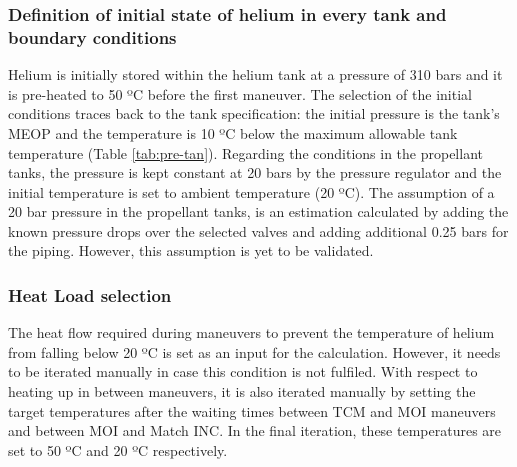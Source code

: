 \subsubsection{Definition of initial state of helium in every tank and boundary conditions}
Helium is initially stored within the helium tank at a pressure of 310 bars and it is pre-heated to 50 ºC before the first maneuver. The selection of the initial conditions traces back to the tank specification: the initial pressure is the tank's MEOP and the temperature is 10 ºC below the maximum allowable tank temperature (Table \ref{tab:pre-tan}). Regarding the conditions in the propellant tanks, the pressure is kept constant at 20 bars by the pressure regulator and the initial temperature is set to ambient temperature (20 ºC). The assumption of a 20 bar pressure in the propellant tanks, is an estimation calculated by adding the known pressure drops over the selected valves and adding additional 0.25 bars for the piping. However, this assumption is yet to be validated.
\subsubsection{Heat Load selection}
The heat flow required during maneuvers to prevent the temperature of helium from falling below 20 ºC is set as an input for the calculation. However, it needs to be iterated manually in case this condition is not fulfiled. With respect to heating up in between maneuvers, it is also iterated manually by setting the target temperatures after the waiting times between TCM and MOI maneuvers and between MOI and Match INC. In the final iteration, these temperatures are set to 50 ºC and 20 ºC respectively. 
